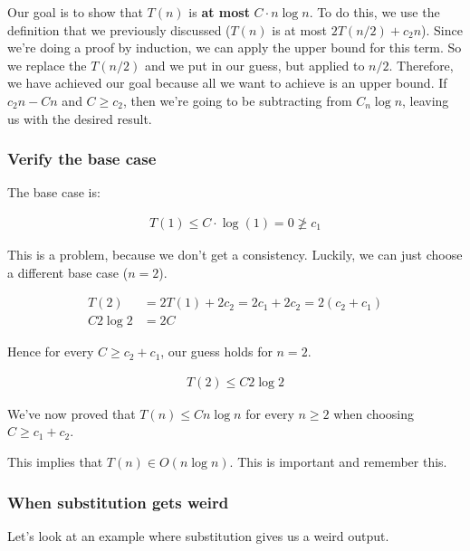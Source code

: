 \documentclass[11pt,a4paper,titlepage,dvipsnames,cmyk]{scrartcl}
\begin{document}
Our goal is to show that $T(n)$ is \textbf{at most} $C \cdot n \log n$. To
do this, we use the definition that we previously discussed ($T(n)$ is at
most $2T(n/2) + c_2n$). Since we're doing a proof by induction, we can apply
the upper bound for this term. So we replace the $T(n/2)$ and we put in
our guess, but applied to $n/2$. Therefore, we have achieved our goal
because all we want to achieve is an upper bound. If $c_2n - Cn$ and $C
\ge c_2$, then we're going to be subtracting from $C_n \log n$, leaving us
with the desired result.

\subsubsection{Verify the base case}%
\label{ssub:Verify the base case}
The base case is:

\begin{align*}
    T(1) \le C \cdot \log (1) = 0 \not \ge c_1
\end{align*}

This is a problem, because we don't get a consistency. Luckily, we can
just choose a different base case ($n = 2$).

\begin{align*}
    T(2) &= 2T(1) + 2c_2 = 2c_1 + 2c_2 = 2(c_2 + c_1) \\
    C2 \log 2 &= 2C
\end{align*}

Hence for every $C \ge c_2 + c_1$, our guess holds for $n = 2$. 

\begin{align*}
    T(2) \le C2 \log 2
\end{align*}

We've now proved that $T(n) \le Cn \log n$ for every $n \ge 2$ when
choosing $C \ge c_1 + c_2$.

This implies that $T(n) \in O(n \log n)$. This is important and remember
this.

\subsubsection{When substitution gets weird}%
\label{ssub:When substitution gets weird}
Let's look at an example where substitution gives us a weird output.
\end{document}

